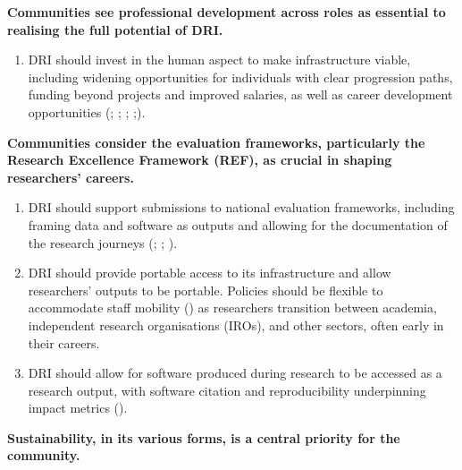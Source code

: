 \documentclass[11pt]{scrartcl}
\begin{document}
\noindent\textbf{Communities see professional development across roles as essential to realising the full potential of DRI.}

\begin{enumerate}[resume]
\item\label{itm:hum} DRI should invest in the human aspect to make infrastructure viable, including widening opportunities for individuals with clear progression paths, funding beyond projects and improved salaries, as well as career development opportunities 
(\cite[71]{de_roure_2022_4716148}; \cite[13,14]{romanova_2021_5105938}; \cite[8]{sichani_2023_8177926}; \cite[33]{taylor_2022_10518740};\cite{duran_del_fierro_2025_17641455}).   
\end{enumerate}

\noindent\textbf{Communities consider the evaluation frameworks, particularly the Research Excellence Framework (REF), as crucial in shaping researchers' careers. } 


\begin{enumerate}[resume]
\item DRI should support submissions to national evaluation frameworks, including framing data and software as outputs and allowing for the documentation of the research journeys
(\cite[4]{wrro203045}; \cite[71]{shoaib_sufi_2023_7686348}; \cite[41]{taylor_2022_10518740}). 

\item DRI should provide portable access to its infrastructure and allow researchers' outputs to be portable. Policies should be flexible to accommodate staff mobility (\cite[37]{taylor_2022_10518740}) as researchers transition between academia, independent research organisations (IROs), and other sectors, often early in their careers. 

\item DRI should allow for software produced during research to be accessed as a research output, with software citation and reproducibility underpinning impact metrics 
(\cite[7]{sichani_2023_8177926}).  

\end{enumerate}

\noindent\textbf{Sustainability, in its various forms, is a central priority for the community.}   
\end{document}
